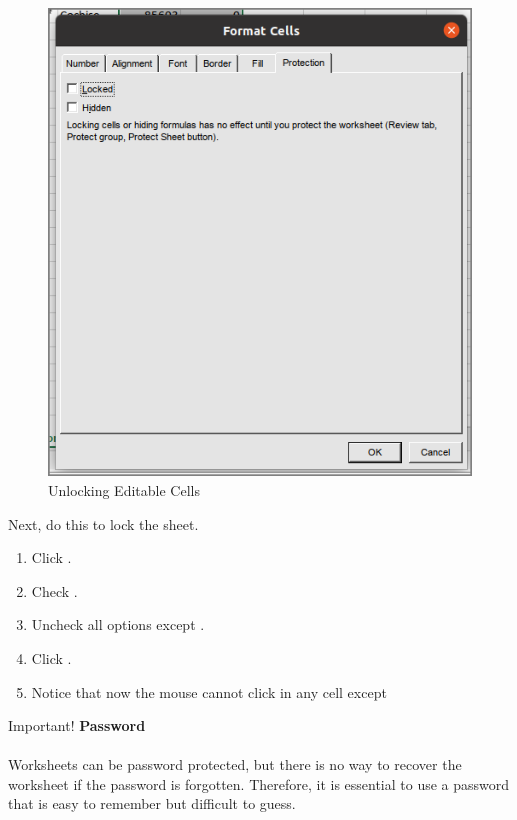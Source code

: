 \begin{figure}[H]
	\centering
	\includegraphics[width=\maxwidth{.95\linewidth}]{gfx/ch07_fig44}
	\caption{Unlocking Editable Cells}
	\label{07:fig44}
\end{figure}

Next, do this to lock the sheet.

\begin{enumerate}
	\item Click .
	\item Check .
	\item Uncheck all options except .
	\item Click .
	\item Notice that now the mouse cannot click in any cell except 
\end{enumerate}

\begin{center}
	\begin{infobox}{Important!}
		\textbf{Password}
		\\
		\\
		Worksheets can be password protected, but there is no way to recover the worksheet if the password is forgotten. Therefore, it is essential to use a password that is easy to remember but difficult to guess.
	\end{infobox}
\end{center}

